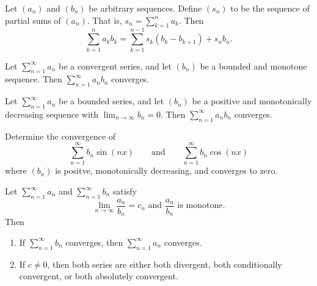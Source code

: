 \begin{theorem}
  Let $(a_n)$ and $(b_n)$ be arbitrary sequences. Define $(s_n)$ to
  be the sequence of partial sums of $(a_n)$. That is, $s_n = \sum_{k
  = 1}^{n} a_k$. Then
  \[ \sum_{k = 1}^{n} a_k b_k = \sum_{k = 1}^{n - 1} s_k (b_k - b_{k
  + 1}) + s_n b_n. \]
\end{theorem}

\begin{proposition}
  Let $\sum_{n = 1}^{\infty} a_n$ be a convergent series, and let
  $(b_n)$ be a bounded and monotone sequence. Then $\sum_{n =
  1}^{\infty} a_n b_n$ converges.
\end{proposition}

\begin{proposition}
  Let $\sum_{n = 1}^{\infty} a_n$ be a bounded series, and let
  $(b_n)$ be a positive and monotonically decreasing sequence with
  $\lim_{n \to \infty} b_n = 0$. Then $\sum_{n = 1}^{\infty} a_n b_n$ converges.
\end{proposition}

\begin{example}
  Determine the convergence of
  \[ \sum_{n = 1}^{\infty} b_n \sin(nx) \qquad \text{and} \qquad
  \sum_{n = 1}^{\infty} b_n \cos(nx) \]
  where $(b_n)$ is positve, monotonically decreasing, and converges to zero.
\end{example}

\begin{proposition}
  Let $\sum_{n = 1}^{\infty} a_n$ and $\sum_{n = 1}^{\infty} b_n$ satisfy
  \[ \text{$\lim_{n \to \infty} \frac{a_n}{b_n} = c_n$ and
  $\frac{a_n}{b_n}$ is monotone.} \]
  Then
  \begin{enumerate}
    \item If $\sum_{n = 1}^{\infty} b_n$ converges, then $\sum_{n =
      1}^{\infty} a_n$ converges.
    \item If $c \neq 0$, then both series are either both divergent,
      both conditionally convergent, or both absolutely convergent.
  \end{enumerate}
\end{proposition}

